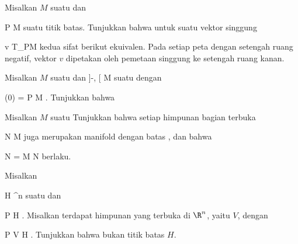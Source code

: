 {}
{

Misalkan $M$ suatu
dan

\mavergleichskette
{\vergleichskette
{ P
}
{ \in }{ \partial M
}
{  }{
}
{    }{
}
{   }{
}
}
{}{}{}
suatu titik batas. Tunjukkan bahwa untuk suatu vektor singgung

\mavergleichskette
{\vergleichskette
{ v
}
{ \in }{ T_PM
}
{  }{
}
{    }{
}
{   }{
}
}
{}{}{}
kedua sifat berikut ekuivalen.
 {Pada setiap peta dengan setengah ruang negatif, vektor $v$ dipetakan oleh pemetaan singgung ke setengah ruang kanan.
}

}
{} {}

{}
{

Misalkan $M$ suatu
dan
\maabbdisp {\gamma} {{]{-\epsilon}, \epsilon[}} {M
} {}
suatu
dengan

\mavergleichskettedisp
{\vergleichskette
{ \gamma (0)
}
{ =} { P
}
{ \in} { \partial M
}
{ } {
}
{ } {
}
}
{}{}{.}
Tunjukkan bahwa

}
{} {}

{}
{

Misalkan $M$ suatu
Tunjukkan bahwa setiap himpunan bagian terbuka

\mavergleichskette
{\vergleichskette
{ N
}
{ \subseteq }{ M
}
{  }{
}
{    }{
}
{   }{
}
}
{}{}{}
juga merupakan manifold dengan batas
 {} {,}
dan bahwa

\mavergleichskettedisp
{\vergleichskette
{ \partial N
}
{ =} { \partial M \cap N
}
{ } {
}
{ } {
}
{ } {
}
}
{}{}{}
berlaku.

}
{} {}

{}
{

Misalkan

\mavergleichskette
{\vergleichskette
{ H
}
{ \subseteq }{ \R^n
}
{  }{
}
{    }{
}
{   }{
}
}
{}{}{}
suatu
dan

\mavergleichskette
{\vergleichskette
{ P
}
{ \in }{ H
}
{  }{
}
{    }{
}
{   }{
}
}
{}{}{.}
Misalkan terdapat himpunan yang terbuka di $\R^n$, yaitu $V$, dengan

\mavergleichskette
{\vergleichskette
{ P
}
{ \in }{ V
}
{ \subseteq }{ H
}
{    }{
}
{   }{
}
}
{}{}{.}
Tunjukkan bahwa
 bukan titik batas $H$.

}
{} {}

